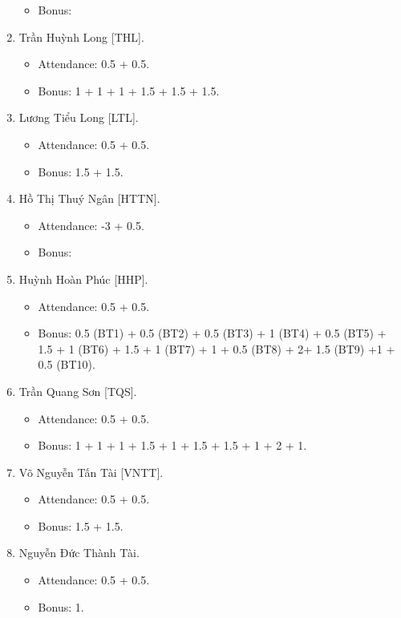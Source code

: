 \documentclass{article}
\begin{document}
\begin{enumerate}
\begin{itemize}
        \item Bonus:
    \end{itemize}
    \item {\sc Trần Huỳnh Long [THL].}
    \begin{itemize}
        \item Attendance: 0.5 + 0.5.
        \item Bonus: 1 + 1 + 1 + 1.5 + 1.5 + 1.5.
    \end{itemize}
    \item {\sc Lương Tiểu Long [LTL].}
    \begin{itemize}
        \item Attendance: 0.5 + 0.5.
        \item Bonus: 1.5 + 1.5.
    \end{itemize}
    \item {\sc Hồ Thị Thuý Ngân [HTTN].}
    \begin{itemize}
        \item Attendance: -3 + 0.5.
        \item Bonus:
    \end{itemize}
    \item {\sc Huỳnh Hoàn Phúc [HHP].}
    \begin{itemize}
        \item Attendance: 0.5 + 0.5.
        \item Bonus: 0.5 (BT1) + 0.5 (BT2) + 0.5 (BT3) + 1 (BT4) + 0.5 (BT5) + 1.5 + 1 (BT6) + 1.5 + 1 (BT7) + 1 + 0.5 (BT8) + 2+ 1.5 (BT9) +1 +  0.5 (BT10).
    \end{itemize}
    \item {\sc Trần Quang Sơn [TQS].}
    \begin{itemize}
        \item Attendance: 0.5 + 0.5.
        \item Bonus: 1 + 1 + 1 + 1.5 + 1 + 1.5 + 1.5 + 1 + 2 + 1.
    \end{itemize}
    \item {\sc Võ Nguyễn Tấn Tài [VNTT].}
    \begin{itemize}
        \item Attendance: 0.5 + 0.5.
        \item Bonus: 1.5 + 1.5.
    \end{itemize}
    \item {\sc Nguyễn Đức Thành Tài.}
    \begin{itemize}
        \item Attendance: 0.5 + 0.5.
        \item Bonus: 1.

\end{itemize}
\end{enumerate}
\end{document}
